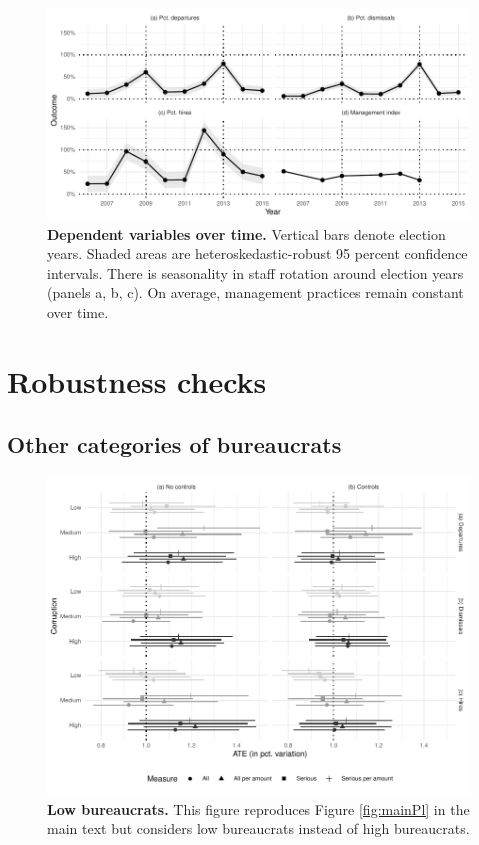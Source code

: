{\begin{figure}[H]
    \centering
    \includegraphics{chapters/chapter_2/figures/dependentVariables}
    \caption{{\bf Dependent variables over time.} Vertical bars denote election years. Shaded areas are heteroskedastic-robust 95 percent confidence intervals. There is seasonality in staff rotation around election years (panels a, b, c). On average, management practices remain constant over time.}
    \label{fig:dvs}
\end{figure}

\section{Robustness checks}
\label{app:robustness}

\subsection{Other categories of bureaucrats}
\label{app:otherBureaucratsRobustness}

\begin{figure}[H]
    \centering
    \includegraphics{chapters/chapter_2/figures/pl_bureaucrat_low.pdf}
    \caption{{\bf Low bureaucrats.} This figure reproduces Figure \ref{fig:mainPl} in the main text but considers low bureaucrats instead of high bureaucrats.}
    \label{fig:plLowBureaucrats}
\end{figure}

}
